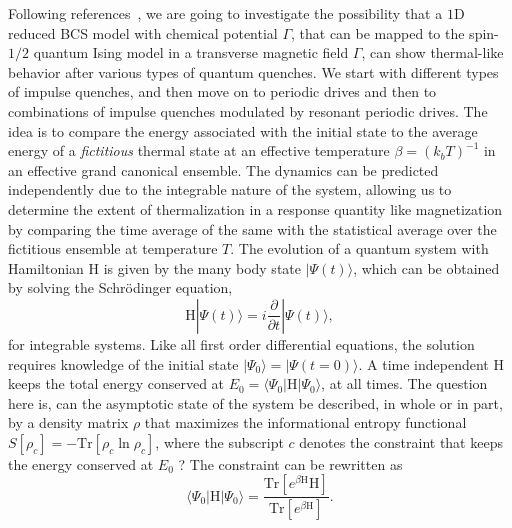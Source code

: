 \documentclass[a4paper,10pt]{article}
\begin{document}
Following references~\cite{rossini,leticia}, we are going to investigate the possibility that a $1$D reduced BCS model with chemical potential $\Gamma$, that can be mapped to the spin-$1/2$ quantum Ising model in a transverse magnetic field $\Gamma$, can show thermal-like behavior after various types of quantum quenches. We start with different types of impulse quenches, and then move on to periodic drives and then to combinations of impulse quenches modulated by resonant periodic drives. The idea is to compare the energy associated with the initial state to the average energy of a \textit{fictitious} thermal state at an effective temperature $\beta=(k_bT)^{-1}$ in an effective grand canonical ensemble. The dynamics can be predicted independently due to the integrable nature of the system, allowing us to determine the extent of thermalization in a response quantity like magnetization by comparing the time average of the same with the statistical average over the fictitious ensemble at temperature $T$. The evolution of a quantum system with Hamiltonian $\mathrm{H}$ is given by the many body state $|\Psi(t)\rangle$, which can be obtained by solving the Schr\"odinger equation,
\begin{equation}
 \label{eq:schr:mb}
 \mathrm{H}|\Psi(t)\rangle = i\frac{\partial}{\partial t}|\Psi(t)\rangle,
\end{equation}
for integrable systems. Like all first order differential equations, the solution requires knowledge of the initial state $|\Psi_0\rangle=|\Psi(t=0)\rangle$. A time independent $\mathrm{H}$ keeps the total energy conserved at $E_0=\langle\Psi_0|\mathrm{H}|\Psi_0\rangle$, at all times. The question here is, can the asymptotic state of the system be described, in whole or in part, by a density matrix $\rho$ that maximizes the informational entropy functional $S[\rho_c]=-\mbox{Tr}[\rho_c\ln{\rho_c}]$, where the subscript $c$ denotes the constraint 
that keeps the energy conserved at $E_0$ ? The constraint can be rewritten as
\begin{equation}
\label{eq:enconstr}
\langle\Psi_0|\mathrm{H}|\Psi_0\rangle = \frac{\mbox{Tr}[e^{\beta\mathrm{H}}\mathrm{H}]}{\mbox{Tr}[e^{\beta\mathrm{H}}]}.
\end{equation}
\end{document}
